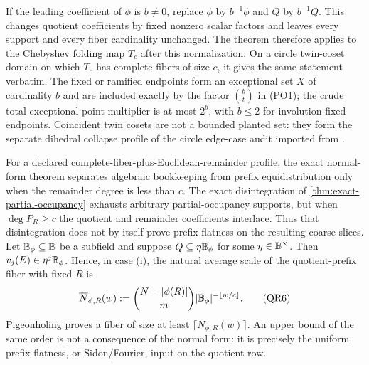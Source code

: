 \documentclass[11pt,a4paper]{amsart}
\numberwithin{equation}{section}
\theoremstyle{remark}
\begin{document}
\begin{remark}
\label{rem:qr-chebyshev}
If the leading coefficient of $\phi$ is $b\ne0$, replace $\phi$ by
$b^{-1}\phi$ and $Q$ by $b^{-1}Q$.  This changes quotient coefficients by
fixed nonzero scalar factors and leaves every support and every fiber
cardinality unchanged.  The theorem therefore applies to the Chebyshev
folding map $T_c$ after this normalization.  On a circle twin-coset domain
on which $T_c$ has complete fibers of size $c$, it gives the same statement
verbatim.  The fixed or ramified endpoints form an exceptional set \(X\)
of cardinality \(b\) and are included exactly by the factor \(\binom bt\)
in \textup{(PO1)}; the crude total exceptional-point multiplier is at most
\(2^b\), with \(b\le2\) for involution-fixed endpoints.  Coincident twin
cosets are not a bounded planted set: they form the separate dihedral
collapse profile of the circle edge-case audit imported from \cite[Sec.~11]{CAP25v132}.
\end{remark}

For a declared complete-fiber-plus-Euclidean-remainder profile, the exact
normal-form theorem separates algebraic bookkeeping from prefix
equidistribution only when the remainder degree is less than \(c\).  The
exact disintegration of \cref{thm:exact-partial-occupancy} exhausts
arbitrary partial-occupancy supports, but when \(\deg P_R\ge c\) the
quotient and remainder coefficients interlace.  Thus that disintegration
does not by itself prove prefix flatness on the resulting coarse slices.
Let
$\mathbb B_\phi\subseteq\mathbb B$ be a subfield and suppose
\(Q\subseteq\eta\mathbb B_\phi\) for some $\eta\in\mathbb B^\times$.  Then
\(v_j(E)\in\eta^j\mathbb B_\phi\).  Hence, in case
\textup{(i)}, the natural average scale of the quotient-prefix fiber with
fixed $R$ is
\[
 \overline N_{\phi,R}(w)
 :=\binom{N-|\phi(R)|}{m}
       |\mathbb B_\phi|^{-\lfloor w/c\rfloor}.             \tag{QR6}\label{eq:qr-natural-scale}
\]
Pigeonholing proves a fiber of size at least
\(\lceil\overline N_{\phi,R}(w)\rceil\).  An upper bound of the same order
is not a consequence of the normal form: it is precisely the uniform
prefix-flatness, or Sidon/Fourier, input on the quotient row.
\end{document}
